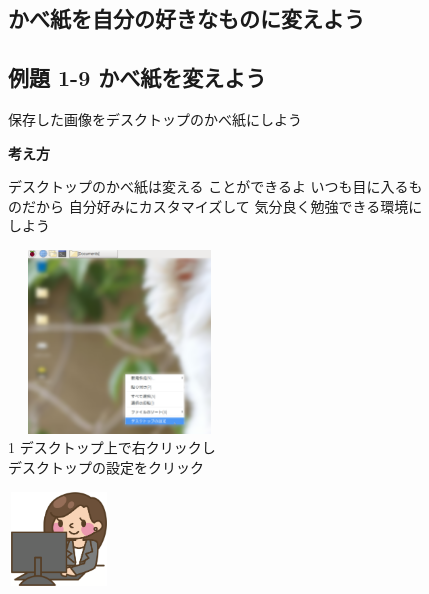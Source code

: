 \documentclass[a4paper,12pt]{jarticle}
\begin{document}
\begin{figure}
\subsection{かべ紙を自分の好きなものに変えよう}
\subsection{例題 1-9 かべ紙を変えよう}
保存した画像をデスクトップのかべ紙にしよう

\textbf{考え方}


\bigskip



\centering
\begin{minipage}{\textwidth}
\begin{minipage}{7.737cm}
デスクトップのかべ紙は変える
ことができるよ
いつも目に入るものだから
自分好みにカスタマイズして
気分良く勉強できる環境にしよう
\begin{minipage}{7.739cm}
\includegraphics[width=5.892cm,height=4.864cm]{textbook-img107.png}\\
1 デスクトップ上で右クリックし\\
デスクトップの設定をクリック
\end{minipage}
\end{minipage}
\begin{minipage}{2.582cm}
\end{minipage}
\begin{minipage}{7.737cm}
\includegraphics[width=2.712cm,height=2.509cm]{textbook-img082.png}

\end{minipage}
\end{minipage}
\end{figure}
\end{document}
